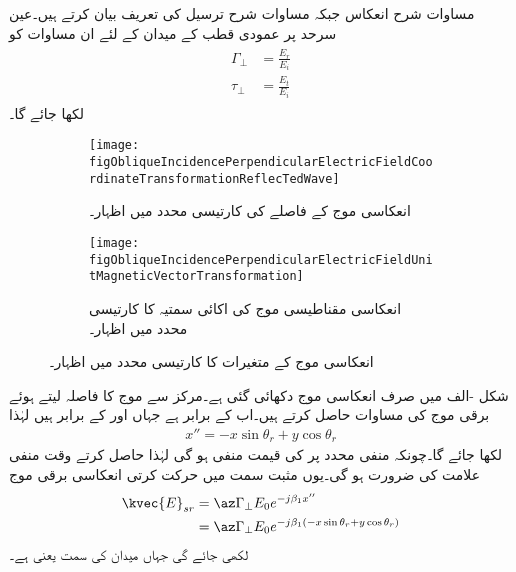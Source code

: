 مساوات  شرح انعکاس جبکہ مساوات  شرح ترسیل کی تعریف بیان کرتے ہیں۔عین سرحد پر عمودی  قطب کے میدان کے لئے ان مساوات کو
\begin{gather}
\begin{aligned}\label{مساوات_ترچھی_سرحدی_شرائط}
\Gamma_{\perp}&=\frac{E_r}{E_i} \\
\tau_{\perp} &=\frac{E_t}{E_i}
\end{aligned}
\end{gather}
لکھا جائے گا۔
\begin{figure}
\centering
\begin{subfigure}{0.4\textwidth}
\centering
\texttt{[image: figObliqueIncidencePerpendicularElectricFieldCoordinateTransformationReflecTedWave]}
\caption{انعکاسی موج کے فاصلے کی کارتیسی محدد میں اظہار۔}
\label{شکل_ترچھی_انعکاسی_برقی}
\end{subfigure}%
\begin{subfigure}{0.4\textwidth}
\centering
\texttt{[image: figObliqueIncidencePerpendicularElectricFieldUnitMagneticVectorTransformation]}
\caption{انعکاسی مقناطیسی موج کی اکائی سمتیہ کا کارتیسی محدد میں اظہار۔}
\label{شکل_ترچھی_انعکاسی_مقناطیسی_اکائی}
\end{subfigure}%
\caption{انعکاسی موج کے متغیرات کا کارتیسی محدد میں اظہار۔}
\label{شکل_ترچھی_اکائی_اظہار}
\end{figure}

شکل -الف میں صرف انعکاسی  موج دکھائی گئی ہے۔مرکز  سے موج کا فاصلہ  لیتے ہوئے برقی موج کی مساوات حاصل کرتے ہیں۔اب  کے برابر ہے جہاں  اور  کے برابر ہیں لہٰذا
\begin{align}
x''=-x \sin \theta_r+y\cos \theta_r
\end{align}
لکھا جائے گا۔چونکہ منفی محدد پر  کی قیمت منفی ہو گی لہٰذا  حاصل کرتے وقت منفی علامت کی ضرورت ہو گی۔یوں مثبت  سمت میں حرکت کرتی  انعکاسی برقی موج
\begin{gather}
\begin{aligned} \label{مساوات_ترچھی_انعکاسی_برقی_میدان_دوری_سمتی}
\kvec{E}_{sr}&=\az \Gamma_{\perp} E_0 e^{- j \beta_1 x''}\\
&=\az \Gamma_{\perp} E_0 e^{- j \beta_1 (-x \sin \theta_r+y\cos \theta_r)}
\end{aligned}
\end{gather}
لکھی جائے گی جہاں میدان کی سمت  یعنی  ہے۔

